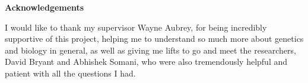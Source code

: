 \thispagestyle{empty}

\begin{center}
    {\LARGE\bf Acknowledgements}
\end{center}

I would like to thank my supervisor Wayne Aubrey, for being incredibly supportive of this project, helping me to understand so much more about genetics and biology in general, as well as giving me lifts to go and meet the researchers, David Bryant and Abhishek Somani, who were also tremendously helpful and patient with all the questions I had. 
